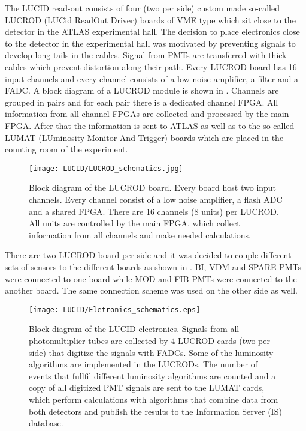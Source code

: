 The LUCID read-out consists of four (two per side) custom made so-called LUCROD (LUCid ReadOut Driver) boards of VME type which sit close to the detector in the ATLAS experimental hall.
The decision to place electronics close to the detector in the experimental hall was motivated by preventing signals to develop long tails in the cables.
Signal from PMTs are transferred with thick cables which prevent distortion along their path.
Every LUCROD board has 16 input channels and every channel consists of a low noise amplifier, a filter and a FADC.
A block diagram of a LUCROD module is shown in .
Channels are grouped in pairs and for each pair there is a dedicated channel FPGA.
All information from all channel FPGAs are collected and processed by the main FPGA.
After that the information is sent to ATLAS as well as to the so-called LUMAT (LUminosity Monitor And Trigger) boards 
which are placed in the counting room of the experiment.

\begin{figure}
\centering
\texttt{[image: LUCID/LUCROD\_schematics.jpg]}
\caption{Block diagram of the LUCROD board. Every board host two input channels. Every channel consist of a low noise amplifier, a flash ADC and a shared FPGA. 
There are 16 channels (8 units) per LUCROD. All units are controlled by the main FPGA, which collect information from all channels and make needed calculations.}
\label{fig:LUCROD_schematics}
\end{figure}

There are two LUCROD board per side and it was decided to couple different sets of sensors to the different boards as shown in 
.
BI, VDM and SPARE PMTs were connected to one board while MOD and FIB PMTs were connected to the another board.
The same connection scheme was used on the other side as well.

\begin{figure}
\centering
\texttt{[image: LUCID/Eletronics\_schematics.eps]}
\caption{Block diagram of the LUCID electronics. Signals from all photomultiplier tubes are collected by 4 \mbox{LUCROD} cards 
(two per side) that digitize the signals with FADCs. Some of the luminosity algorithms are implemented in the LUCRODs. 
The number of events that fullfil different luminosity algorithms are counted and a copy of all digitized PMT 
signals are sent to the LUMAT cards, which perform calculations with algorithms that combine data from 
both detectors and publish the results to the Information Server (IS) database.}
\label{fig:Eletronics_schematics}
\end{figure}

